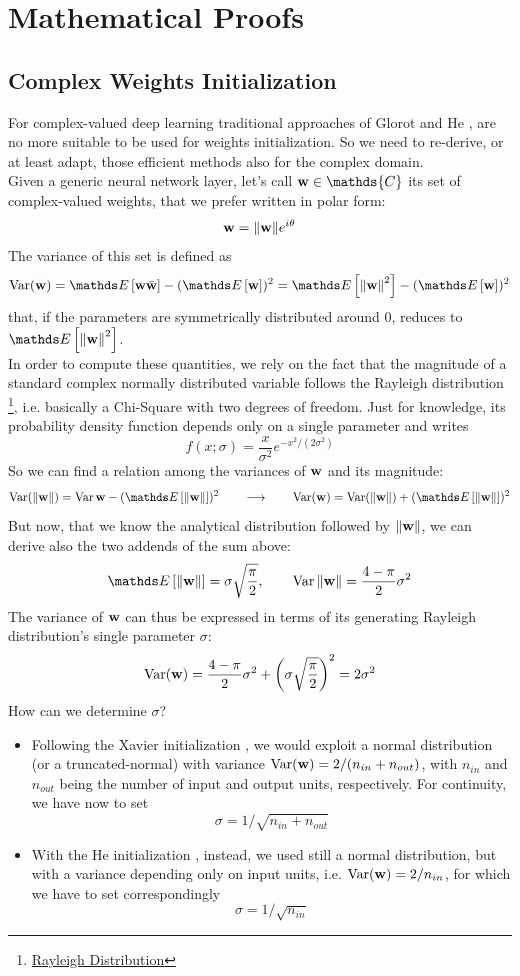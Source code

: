 \documentclass[../main.tex]{subfiles}
\begin{document}
	
\chapter{Mathematical Proofs}
\label{app:cmplx_optim}


\section{Complex Weights Initialization \cite{trabelsi2018deep}}
\label{app:weight_init}

For complex-valued deep learning traditional approaches of Glorot \cite{xavier_init} and He \cite{he2015delving}, are no more suitable to be used for weights initialization. So we need to re-derive, or at least adapt, those efficient methods also for the complex domain.\\
Given a generic neural network layer, let's call $\vb{w}\in\mathds{C}$ its set of complex-valued weights, that we prefer written in polar form:
\[ \vb{w} = \norm{\vb{w}}e^{i\theta} \]
The variance of this set is defined as 
\[ \Var(\vb{w}) = \Ev{\vb{w}\bar{\vb{w}}} - (\Ev{\vb{w}})^2 = \Ev{\norm{\vb{w}}^2} - (\Ev{\vb{w}})^2 \]
that, if the parameters are symmetrically distributed around 0, reduces to $\Ev{\norm{\vb{w}}^2}$.\\
In order to compute these quantities, we rely on the fact that the magnitude of a standard complex normally distributed variable follows the Rayleigh distribution \footnote{\href{https://en.wikipedia.org/wiki/Rayleigh\_distribution}{Rayleigh Distribution}}, i.e. basically a Chi-Square with two degrees of freedom. Just for knowledge, its probability density function depends only on a single parameter and writes
\[ f(x; \sigma) = \frac{x}{\sigma^2}e^{-x^2 / (2\sigma^2)} \]
So we can find a relation among the variances of $\vb{w}$ and its magnitude:
\[ \Var(\norm{\vb{w}}) = \Var{\vb{w}} - (\Ev{\norm{\vb{w}}})^2 \qquad\longrightarrow\qquad \Var({\vb{w}}) = \Var(\norm{\vb{w}}) + (\Ev{\norm{\vb{w}}})^2 \]
But now, that we know the analytical distribution followed by $\norm{\vb{w}}$, we can derive also the two addends of the sum above:
\[ \Ev{\norm{\vb{w}}} = \sigma\sqrt{\frac{\pi}{2}}, \qquad \Var{\norm{\vb{w}}} = \frac{4-\pi}{2}\sigma^2 \]
The variance of $\vb{w}$ can thus be expressed in terms of its generating Rayleigh distribution's single parameter $\sigma$:
\[ \operatorname{Var}(\vb{w}) = \frac{4-\pi}{2}\sigma^2 + \left(\sigma\sqrt{\frac{\pi}{2}}\right)^2 = 2\sigma^2 \]
How can we determine $\sigma$?\\
\begin{itemize}
	\item Following the Xavier initialization \cite{xavier_init}, we would exploit a normal distribution (or a truncated-normal) with variance $\operatorname{Var}(\vb{w}) = 2 / (n_{in} + n_{out})$, with $n_{in}$ and $n_{out}$ being the number of input and output units, respectively. For continuity, we have now to set
	\[ \sigma = 1 / \sqrt{n_{in} + n_{out}} \]
	\item With the He initialization \cite{he2015delving}, instead, we used still a normal distribution, but with a variance depending only on input units, i.e. $\operatorname{Var}(\vb{w}) = 2/n_{in}$, for which we have to set correspondingly
	\[ \sigma = 1 / \sqrt{n_{in}} \]
\end{itemize}
\end{document}
